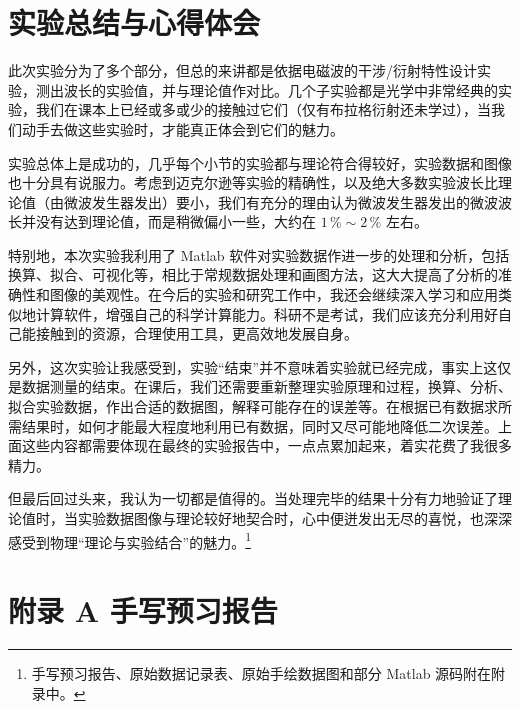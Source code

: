 \documentclass[UTF8]{article}
\theoremstyle{MyLineTheoremStyle} %
\theoremstyle{MyBlockTheoremStyle} %
\theoremstyle{MySubsubsectionStyle} %
\begin{document}
\section{实验总结与心得体会}


此次实验分为了多个部分，但总的来讲都是依据电磁波的干涉/衍射特性设计实验，测出波长的实验值，并与理论值作对比。几个子实验都是光学中非常经典的实验，我们在课本上已经或多或少的接触过它们（仅有布拉格衍射还未学过），当我们动手去做这些实验时，才能真正体会到它们的魅力。

实验总体上是成功的，几乎每个小节的实验都与理论符合得较好，实验数据和图像也十分具有说服力。考虑到迈克尔逊等实验的精确性，以及绝大多数实验波长比理论值（由微波发生器发出）要小，我们有充分的理由认为微波发生器发出的微波波长并没有达到理论值，而是稍微偏小一些，大约在 $1\,\% \sim 2\,\%$ 左右。

特别地，本次实验我利用了 Matlab 软件对实验数据作进一步的处理和分析，包括换算、拟合、可视化等，相比于常规数据处理和画图方法，这大大提高了分析的准确性和图像的美观性。在今后的实验和研究工作中，我还会继续深入学习和应用类似地计算软件，增强自己的科学计算能力。科研不是考试，我们应该充分利用好自己能接触到的资源，合理使用工具，更高效地发展自身。

另外，这次实验让我感受到，实验“结束”并不意味着实验就已经完成，事实上这仅是数据测量的结束。在课后，我们还需要重新整理实验原理和过程，换算、分析、拟合实验数据，作出合适的数据图，解释可能存在的误差等。在根据已有数据求所需结果时，如何才能最大程度地利用已有数据，同时又尽可能地降低二次误差。上面这些内容都需要体现在最终的实验报告中，一点点累加起来，着实花费了我很多精力。

但最后回过头来，我认为一切都是值得的。当处理完毕的结果十分有力地验证了理论值时，当实验数据图像与理论较好地契合时，心中便迸发出无尽的喜悦，也深深感受到物理“理论与实验结合”的魅力。\footnote{手写预习报告、原始数据记录表、原始手绘数据图和部分 Matlab 源码附在附录中。}


\newpage
\section*{附录 A\hspace*{20pt} 手写预习报告}
\thispagestyle{fancy} 

\begin{figure}[H]\centering
    
\end{figure}

\end{document}
